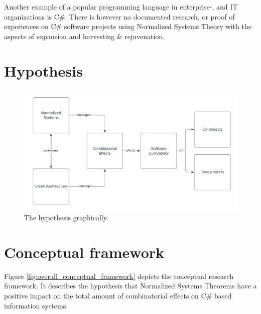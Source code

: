 Another example of a popular programming language in enterprise-, and IT organizations is
C\#. There is however no documented research, or proof of experiences on C\# software
projects using Normalized Systems Theory with the aspects of expansion and harvesting \&
rejuvenation.

\section{Hypothesis} \label{hypothesis}
\begin{figure}[!h]
    \centering
    \includegraphics[width=1\textwidth]{Figures/hypothesis.pdf}
    \caption[The hypothesis graphically.]{The hypothesis graphically.}
    \label{fig:hypothesis}
\end{figure}

\section{Conceptual framework} \label{conceptual_framework}
Figure \ref{fig:overall_conceptual_framework} depicts the conceptual research framework.
It describes the hypothesis that Normalized Systems Theorems have a positive impact on the
total amount of combinatorial effects on C\# based information systems.

